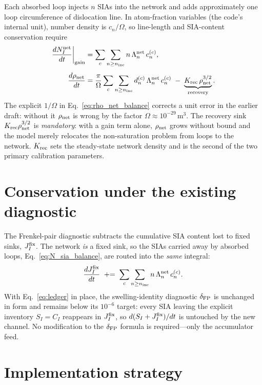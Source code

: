 \documentclass[11pt,a4paper]{article}
\begin{document}
Each absorbed loop injects $n$ SIAs into the network and adds approximately one
loop circumference of dislocation line.  In atom-fraction variables (the code's
internal unit), number density is $c_n/\Omega$, so line-length and SIA-content
conservation require
\begin{align}
  \left.\frac{dN_{I}^{\rm net}}{dt}\right|_{\rm gain}
  &=\sum_{c}\sum_{n\ge n_{\rm inc}} n\,\Lambda_n^{\rm net}\,c_n^{(c)},
  \label{eq:N_sia_balance}\\[4pt]
  \frac{d\rho_{\rm net}}{dt}
  &=\frac{\pi}{\Omega}\sum_{c}\sum_{n\ge n_{\rm inc}} d_n^{(c)}\,\Lambda_n^{\rm net}\,c_n^{(c)}
  \;-\;\underbrace{K_{\rm rec}\,\rho_{\rm net}^{3/2}}_{\text{recovery}}.
  \label{eq:rho_net_balance}
\end{align}
The explicit $1/\Omega$ in Eq.~\eqref{eq:rho_net_balance} corrects a unit error
in the earlier draft: without it $\rho_{\rm net}$ is wrong by the factor
$\Omega\!\approx\!10^{-29}\,\mathrm{m^3}$.  The recovery sink
$K_{\rm rec}\rho_{\rm net}^{3/2}$ is \emph{mandatory}: with a gain term alone,
$\rho_{\rm net}$ grows without bound and the model merely relocates the
non-saturation problem from loops to the network.  $K_{\rm rec}$ sets the
steady-state network density and is the second of the two primary calibration
parameters.

\section{Conservation under the existing diagnostic}
\label{sec:conservation}

The Frenkel-pair diagnostic subtracts the cumulative SIA content lost to fixed
sinks, $J^{\rm fix}_{I}$.  The network \emph{is} a fixed sink, so the SIAs
carried away by absorbed loops, Eq.~\eqref{eq:N_sia_balance}, are routed into
the \emph{same} integral:
\begin{equation}
  \frac{dJ^{\rm fix}_{I}}{dt}\;\mathrel{+}=\;
  \sum_{c}\sum_{n\ge n_{\rm inc}} n\,\Lambda_n^{\rm net}\,c_n^{(c)}.
  \label{eq:ledger}
\end{equation}
With Eq.~\eqref{eq:ledger} in place, the swelling-identity diagnostic
$\delta_{\rm FP}$ is unchanged in form and remains below its $10^{-6}$ target:
every SIA leaving the explicit inventory $S_I=C_I$ reappears in $J^{\rm
fix}_{I}$, so $d(S_I+J^{\rm fix}_{I})/dt$ is untouched by the new channel.  No
modification to the $\delta_{\rm FP}$ formula is required---only the
accumulator feed.

\section{Implementation strategy}
\label{sec:impl}
\end{document}
